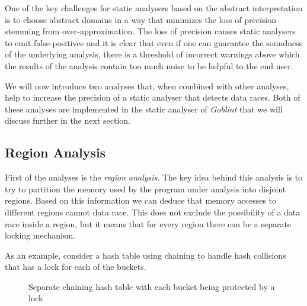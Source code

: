 \documentclass[..thesis.tex]{subfiles}
\begin{document}
One of the key challenges for static analysers based on the abstract interpretation is to choose abstract domains in a way that minimizes the loss
of precision stemming from over-approximation.
The loss of precision causes static analysers to emit false-positives and it is clear
that even if one can guarantee the soundness of the underlying analysis, there is a threshold of incorrect warnings above which the results of the analysis contain too much noise to be helpful to the end user.

We will now introduce two analyses that, when combined with other analyses, help to increase the precision of a static analyser that detects data races.
Both of these analyses are implemented in the static analyser of \textit{Goblint} that we will discuss further in the next section.


\subsection{Region Analysis}

First of the analyses is the \textit{region analysis}. The key idea behind this analysis is to try to partition the memory used by the program under analysis into disjoint regions. Based on this information we can deduce that memory accesses to different regions cannot data race.
This does not exclude the possibility of a data race inside a region, but it means that for every region there can be a separate locking mechanism.

As an example, consider a hash table using chaining to handle hash collisions that has a lock for each of the buckets.


\begin{figure}[H]
  \centering
  \caption{Separate chaining hash table with each bucket being protected by a lock} 
\end{figure}
\end{document}

